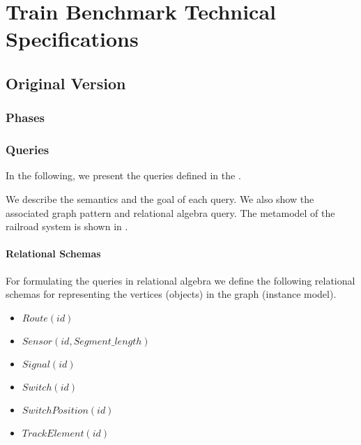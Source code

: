 \chapter{Train Benchmark Technical Specifications}

\section{Original Version}

\subsection{Phases}

\subsection{Queries}


In the following, we present the queries defined in the \tb{}. %

We describe the semantics and the goal of each query. We also show the associated graph pattern and relational algebra query. The metamodel of the railroad system is shown in .

\subsubsection{Relational Schemas}

For formulating the queries in relational algebra we define the following relational schemas for representing the vertices (objects) in the graph (instance model).

\begin{itemize}
  \item $ \mathit{Route}\left(\mathit{id}\right) $
  \item $ \mathit{Sensor}\left(\mathit{id}, \mathit{Segment\_length}\right) $
  \item $ \mathit{Signal}\left(\mathit{id}\right) $
  \item $ \mathit{Switch}\left(\mathit{id}\right) $
  \item $ \mathit{SwitchPosition}\left(\mathit{id}\right) $
  \item $ \mathit{TrackElement}\left(\mathit{id}\right) $
\end{itemize}

